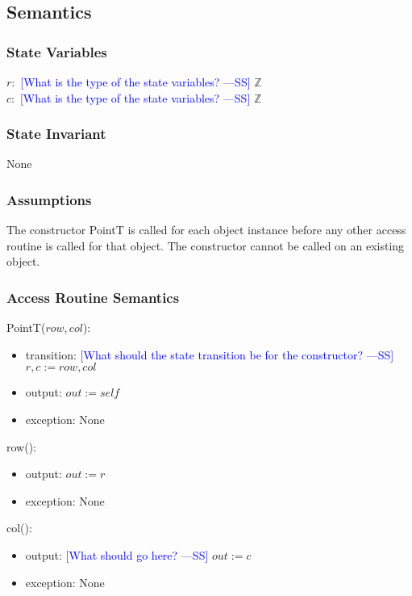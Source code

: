 \documentclass[12pt]{article}
\newcommand{\authornote}[3]{\textcolor{#1}{[#3 ---#2]}}
\newcommand{\authornote}[3]{}
\newcommand{\wss}[1]{\authornote{blue}{SS}{#1}}
\begin{document}
\subsection* {Semantics}

\subsubsection* {State Variables}

$r:$ \wss{What is the type of the state variables?} $\mathbb{Z}$  \\ 
$c:$ \wss{What is the type of the state variables?} $\mathbb{Z}$

\subsubsection* {State Invariant}

None

\subsubsection* {Assumptions}

The constructor PointT is called for each object instance before any other
access routine is called for that object.  The constructor cannot be called on
an existing object.

\subsubsection* {Access Routine Semantics}

PointT($row, col$):
\begin{itemize}
\item transition: \wss{What should the state transition be for the constructor?} $r, c := row, col$ 
\item output: $out := \mathit{self}$
\item exception: None
\end{itemize}

\noindent row():
\begin{itemize}
\item output: $out := r$
\item exception: None
\end{itemize}

\noindent col():
\begin{itemize}
\item output: \wss{What should go here?} $out := c$
\item exception: None
\end{itemize}
\end{document}
